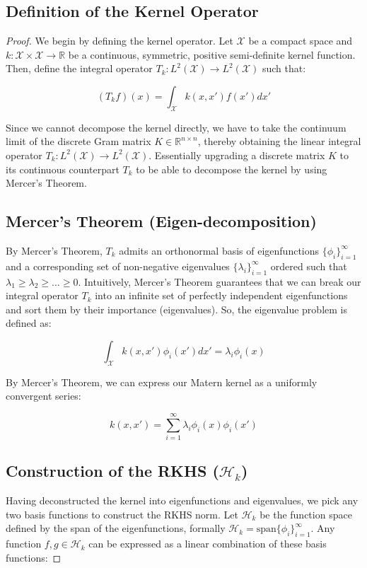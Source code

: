 \documentclass[12pt,oneside]{report}
\theoremstyle{definition}
\theoremstyle{remark}
\begin{document}
\subsection{Definition of the Kernel Operator}
\begin{proof}
We begin by defining the kernel operator. Let $\mathcal{X}$ be a compact space and $k: \mathcal{X} \times \mathcal{X} \to \mathbb{R}$ be a continuous, symmetric, positive semi-definite kernel function. Then, define the integral operator $T_k: L^2(\mathcal{X}) \to L^2(\mathcal{X})$ such that:

$$(T_k f)(x) = \int_{\mathcal{X}} k(x, x') f(x') dx'$$

Since we cannot decompose the kernel directly, we have to take the continuum limit of the discrete Gram matrix $K \in \mathbb{R}^{n \times n}$, thereby obtaining the linear integral operator $T_k: L^2(\mathcal{X}) \to L^2(\mathcal{X})$. Essentially upgrading a discrete matrix $K$ to its continuous counterpart $T_k$ to be able to decompose the kernel by using Mercer's Theorem.

\subsection{Mercer's Theorem (Eigen-decomposition)}
By Mercer’s Theorem, $T_k$ admits an orthonormal basis of eigenfunctions $\{\phi_i\}_{i=1}^{\infty}$ and a corresponding set of non-negative eigenvalues $\{\lambda_i\}_{i=1}^{\infty}$ ordered such that $\lambda_1 \ge \lambda_2 \ge \dots \ge 0$. Intuitively, Mercer's Theorem guarantees that we can break our integral operator $T_k$ into an infinite set of perfectly independent eigenfunctions and sort them by their importance (eigenvalues). So, the eigenvalue problem is defined as:

$$\int_{\mathcal{X}} k(x, x') \phi_i(x') dx' = \lambda_i \phi_i(x)$$

By Mercer's Theorem, we can express our Matern kernel as a uniformly convergent series:

$$k(x, x') = \sum_{i=1}^{\infty} \lambda_i \phi_i(x) \phi_i(x')$$

\subsection{Construction of the RKHS ($\mathcal{H}_k$)}
Having deconstructed the kernel into eigenfunctions and eigenvalues, we pick any two basis functions to construct the RKHS norm. Let $\mathcal{H}_k$ be the function space defined by the span of the eigenfunctions, formally $\mathcal{H}_k = \text{span}\{\phi_i\}_{i=1}^{\infty}$. Any function $f, g \in \mathcal{H}_k$ can be expressed as a linear combination of these basis functions:


\end{proof}
\end{document}
